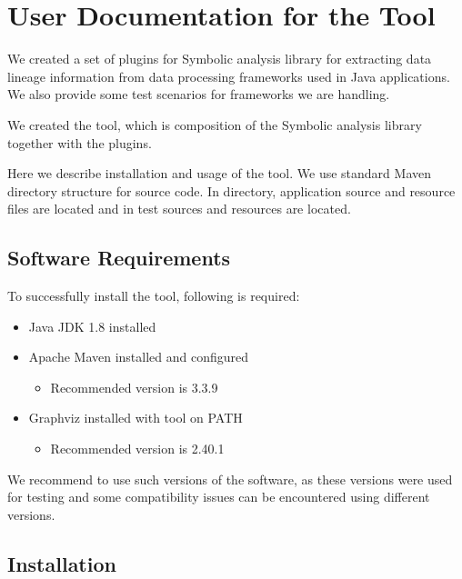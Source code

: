 
\chapter{User Documentation for the \ToolName Tool \label{chapter:program}}

We created a set of plugins for Symbolic analysis library
for extracting data lineage information from data processing frameworks used in Java applications.
We also provide some test scenarios for frameworks we are handling.

We created the \ToolName tool, which is composition of the
Symbolic analysis library together with the plugins.

Here we describe installation and usage of the \ToolName tool.
We use standard Maven directory structure for source code.
In  directory, application source and resource files
are located and in  test sources and resources
are located.



\section{Software Requirements}

To successfully install the \ToolName tool, following is required:

\begin{itemize}
  \item Java JDK 1.8 installed
  \item Apache Maven installed and configured
    \begin{itemize}
      \item Recommended version is 3.3.9
    \end{itemize}
  \item Graphviz installed with tool  on PATH
    \begin{itemize}
      \item Recommended version is 2.40.1
    \end{itemize}
\end{itemize}

We recommend to use such versions of the software,
as these versions were used for testing and some compatibility
issues can be encountered using different versions.



\section{Installation}

